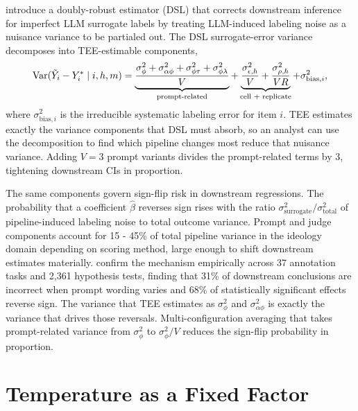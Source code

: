\citet{egami2024dsl} introduce a doubly-robust estimator (DSL) that corrects downstream inference for imperfect LLM surrogate labels by treating LLM-induced labeling noise as a nuisance variance to be partialed out. The DSL surrogate-error variance decomposes into TEE-estimable components,
\begin{equation}
\operatorname{Var}(\tilde{Y}_i - Y_i^* \mid i, h, m) = \underbrace{\frac{\sigma^2_\phi + \sigma^2_{\alpha\phi} + \sigma^2_{\phi\tau} + \sigma^2_{\phi\lambda}}{V}}_{\text{prompt-related}} + \underbrace{\frac{\sigma^2_{\epsilon,h}}{V} + \frac{\sigma^2_{\rho,h}}{V R}}_{\text{cell + replicate}} + \sigma^2_{\text{bias},i},
\end{equation}
where $\sigma^2_{\text{bias},i}$ is the irreducible systematic labeling error for item $i$. TEE estimates exactly the variance components that DSL must absorb, so an analyst can use the decomposition to find which pipeline changes most reduce that nuisance variance. Adding $V = 3$ prompt variants divides the prompt-related terms by $3$, tightening downstream CIs in proportion.

The same components govern sign-flip risk in downstream regressions. The probability that a coefficient $\hat{\beta}$ reverses sign rises with the ratio $\sigma^2_{\text{surrogate}} / \sigma^2_{\text{total}}$ of pipeline-induced labeling noise to total outcome variance. Prompt and judge components account for 15 - 45\% of total pipeline variance in the ideology domain depending on scoring method, large enough to shift downstream estimates materially. \citet{baumann2025llmhacking} confirm the mechanism empirically across 37 annotation tasks and 2,361 hypothesis tests, finding that 31\% of downstream conclusions are incorrect when prompt wording varies and 68\% of statistically significant effects reverse sign. The variance that TEE estimates as $\sigma^2_\phi$ and $\sigma^2_{\alpha\phi}$ is exactly the variance that drives those reversals. Multi-configuration averaging that takes prompt-related variance from $\sigma^2_\phi$ to $\sigma^2_\phi / V$ reduces the sign-flip probability in proportion.



\clearpage

\section{Temperature as a Fixed Factor}
\label{si:temperature}


